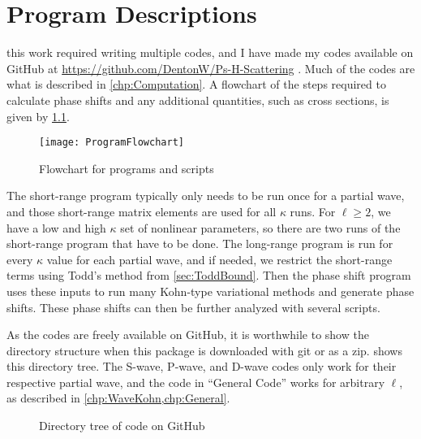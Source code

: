 \documentclass[Dissertation.tex]{subfiles}
\begin{document}
\chapter{Program Descriptions}
\label{chp:Programs}

\iftoggle{UNT}{Doing}{\lettrine{\textcolor{startcolor}{D}}{oing}}
this work required writing multiple
codes, and I have made my codes available on GitHub at 
\url{https://github.com/DentonW/Ps-H-Scattering} \cite{GitHub}. Much of the
codes are what is described in \cref{chp:Computation}. A flowchart of the
steps required to calculate phase shifts and any additional quantities, such
as cross sections, is given by \cref{fig:ProgramFlowchart}.

\begin{figure}
	\centering
	\texttt{[image: ProgramFlowchart]}
	\caption{Flowchart for programs and scripts}
	\label{fig:ProgramFlowchart}
\end{figure}

The short-range program typically only needs to be run once for a partial wave,
and those short-range matrix elements are used for all $\kappa$ runs. For
$\ell \geq 2$, we have a low and high $\kappa$ set of nonlinear parameters, so
there are two runs of the short-range program that have to be done. The
long-range program is run for every $\kappa$ value for each partial wave, and
if needed, we restrict the short-range terms using Todd's method from
\cref{sec:ToddBound}. Then the phase shift program uses these inputs to run
many Kohn-type variational methods and generate phase shifts. These phase shifts
can then be further analyzed with several scripts.


As the codes are freely available on GitHub, it is worthwhile to show the
directory structure when this package is downloaded with git or as a zip.
 shows this directory tree. The S-wave, P-wave, and D-wave
codes only work for their respective partial wave, and the code in ``General 
Code'' works for arbitrary $\ell$, as described in \cref{chp:WaveKohn,chp:General}.

\begin{figure}[H]
\label{fig:directory}       
\caption{Directory tree of code on GitHub \cite{GitHub}}
\label{fig:dirtree}
\end{figure}
\end{document}
